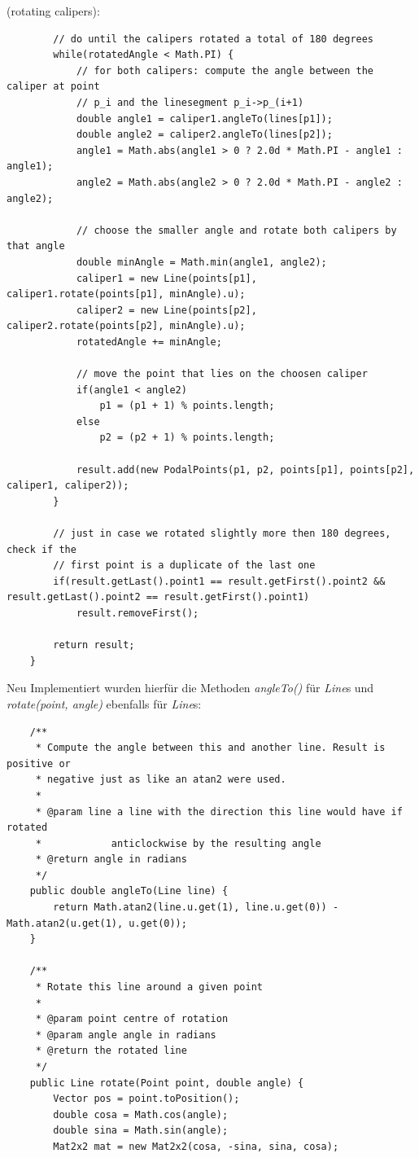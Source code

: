 \documentclass[a4paper, titlepage=false, parskip=full-, 10pt]{scrartcl}
\newcounter{tasknbr}
\newenvironment{task}[1]{{\bf Aufgabe \arabic {tasknbr}\stepcounter{tasknbr}} (#1):\begin{enumerate}}{\end{enumerate}}
\begin{document}
\begin{task}{rotating calipers}
\begin{lstlisting}
        // do until the calipers rotated a total of 180 degrees
        while(rotatedAngle < Math.PI) {
            // for both calipers: compute the angle between the caliper at point
            // p_i and the linesegment p_i->p_(i+1)
            double angle1 = caliper1.angleTo(lines[p1]);
            double angle2 = caliper2.angleTo(lines[p2]);
            angle1 = Math.abs(angle1 > 0 ? 2.0d * Math.PI - angle1 : angle1);
            angle2 = Math.abs(angle2 > 0 ? 2.0d * Math.PI - angle2 : angle2);

            // choose the smaller angle and rotate both calipers by that angle
            double minAngle = Math.min(angle1, angle2);
            caliper1 = new Line(points[p1], caliper1.rotate(points[p1], minAngle).u);
            caliper2 = new Line(points[p2], caliper2.rotate(points[p2], minAngle).u);
            rotatedAngle += minAngle;

            // move the point that lies on the choosen caliper
            if(angle1 < angle2)
                p1 = (p1 + 1) % points.length;
            else
                p2 = (p2 + 1) % points.length;

            result.add(new PodalPoints(p1, p2, points[p1], points[p2], caliper1, caliper2));
        }

        // just in case we rotated slightly more then 180 degrees, check if the
        // first point is a duplicate of the last one
        if(result.getLast().point1 == result.getFirst().point2 && result.getLast().point2 == result.getFirst().point1)
            result.removeFirst();

        return result;
    }
\end{lstlisting}
Neu Implementiert wurden hierfür die Methoden \emph{angleTo()} für \emph{Line}s und \emph{rotate(point, angle)} ebenfalls für \emph{Line}s:
\begin{lstlisting}
    /**
     * Compute the angle between this and another line. Result is positive or
     * negative just as like an atan2 were used.
     * 
     * @param line a line with the direction this line would have if rotated
     *            anticlockwise by the resulting angle
     * @return angle in radians
     */
    public double angleTo(Line line) {
        return Math.atan2(line.u.get(1), line.u.get(0)) - Math.atan2(u.get(1), u.get(0));
    }

    /**
     * Rotate this line around a given point
     * 
     * @param point centre of rotation
     * @param angle angle in radians
     * @return the rotated line
     */
    public Line rotate(Point point, double angle) {
        Vector pos = point.toPosition();
        double cosa = Math.cos(angle);
        double sina = Math.sin(angle);
        Mat2x2 mat = new Mat2x2(cosa, -sina, sina, cosa);


\end{lstlisting}
\end{task}
\end{document}
